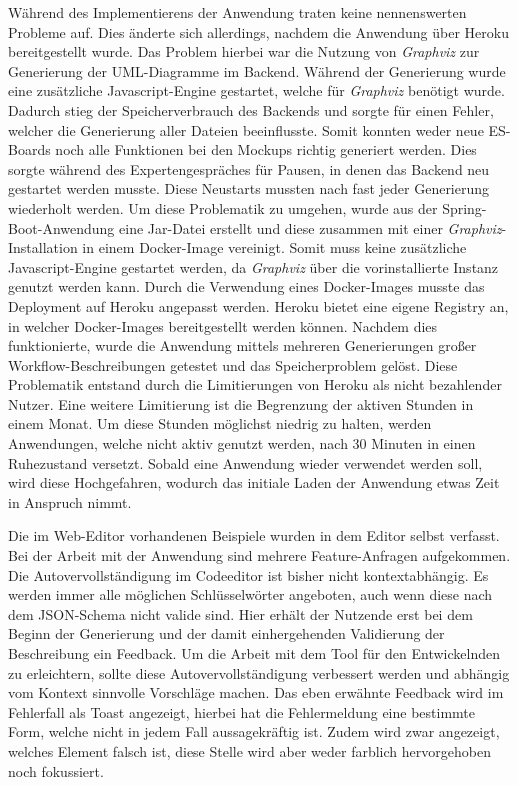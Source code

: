 Während des Implementierens der Anwendung traten keine nennenswerten Probleme auf.
Dies änderte sich allerdings, nachdem die Anwendung über Heroku bereitgestellt wurde.
Das Problem hierbei war die Nutzung von \textit{Graphviz} zur Generierung der UML-Diagramme im Backend.
Während der Generierung wurde eine zusätzliche Javascript-Engine gestartet, welche für \textit{Graphviz} benötigt wurde.
Dadurch stieg der Speicherverbrauch des Backends und sorgte für einen Fehler, welcher die Generierung aller Dateien beeinflusste.
Somit konnten weder neue \ac{ES}-Boards noch alle Funktionen bei den Mockups richtig generiert werden.
Dies sorgte während des Expertengespräches für Pausen, in denen das Backend neu gestartet werden musste.
Diese Neustarts mussten nach fast jeder Generierung wiederholt werden.
Um diese Problematik zu umgehen, wurde aus der Spring-Boot-Anwendung eine Jar-Datei erstellt und diese zusammen mit einer \textit{Graphviz}-Installation in einem Docker-Image
vereinigt\cite*{size-problem}.
Somit muss keine zusätzliche Javascript-Engine gestartet werden, da \textit{Graphviz} über die vorinstallierte Instanz genutzt werden kann.
Durch die Verwendung eines Docker-Images musste das Deployment auf Heroku angepasst werden.
Heroku bietet eine eigene Registry an, in welcher Docker-Images bereitgestellt werden können\cite*{heroku-registry}.
Nachdem dies funktionierte, wurde die Anwendung mittels mehreren Generierungen großer Workflow-Beschreibungen getestet und das Speicherproblem gelöst.
Diese Problematik entstand durch die Limitierungen von Heroku als nicht bezahlender Nutzer\cite*{size-problem}.
Eine weitere Limitierung ist die Begrenzung der aktiven Stunden in einem Monat.
Um diese Stunden möglichst niedrig zu halten, werden Anwendungen, welche nicht aktiv genutzt werden, nach 30 Minuten in einen Ruhezustand versetzt.
Sobald eine Anwendung wieder verwendet werden soll, wird diese Hochgefahren, wodurch das initiale Laden der Anwendung etwas Zeit in Anspruch nimmt\cite*{heroku-limits}.

Die im Web-Editor vorhandenen Beispiele wurden in dem Editor selbst verfasst.
Bei der Arbeit mit der Anwendung sind mehrere Feature-Anfragen aufgekommen.
Die Autovervollständigung im Codeeditor ist bisher nicht kontextabhängig.
Es werden immer alle möglichen Schlüsselwörter angeboten, auch wenn diese nach dem JSON-Schema nicht valide sind.
Hier erhält der Nutzende erst bei dem Beginn der Generierung und der damit einhergehenden Validierung der Beschreibung ein Feedback.
Um die Arbeit mit dem Tool für den Entwickelnden zu erleichtern, sollte diese Autovervollständigung verbessert werden und abhängig vom Kontext
sinnvolle Vorschläge machen.
Das eben erwähnte Feedback wird im Fehlerfall als Toast angezeigt, hierbei hat die Fehlermeldung eine bestimmte Form, welche nicht in jedem Fall aussagekräftig ist.
Zudem wird zwar angezeigt, welches Element falsch ist, diese Stelle wird aber weder farblich hervorgehoben noch fokussiert.

